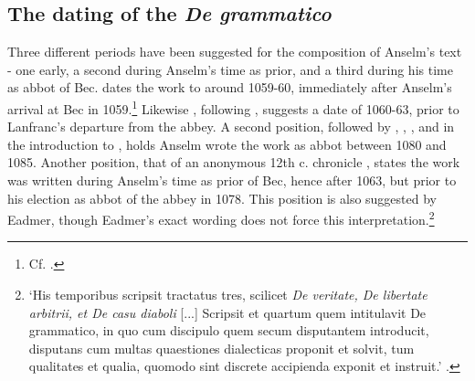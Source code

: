 \documentclass[]{article}
\begin{document}
\subsection{The dating of the \textit{De grammatico}}
Three different periods have been suggested for the composition of Anselm's text - one early, a second during Anselm's time as prior, and a third during his time as abbot of Bec. \cite[sec. 1]{Williams2015} dates the work to around 1059-60, immediately after Anselm's arrival at Bec in 1059.\footnote{Cf. \cite[p. 4]{Visser2009}.} Likewise \cite[p. 128]{Gasper2004}, following \cite[p. 65]{Southern1990}, suggests a date of 1060-63, prior to Lanfranc's departure from the abbey. A second position, followed by \cite{Schmidt1968}, \cite{Lewry1981}, \cite{Sharpe2009}, and in the introduction to \cite{Anselm1990}, holds Anselm wrote the work as abbot between 1080 and 1085. Another position, that of an anonymous 12th c. chronicle \cite[v. 158, 131-133]{PL}, states the work was written during Anselm's time as prior of Bec, hence after 1063, but prior to his election as abbot of the abbey in 1078. This position is also suggested by Eadmer, though Eadmer's exact wording does not force this interpretation.\footnote{`His temporibus scripsit tractatus tres, scilicet \textit{De veritate, De libertate arbitrii, et De casu diaboli} [...] Scripsit et quartum quem intitulavit De grammatico, in quo cum discipulo quem secum disputantem introducit, disputans cum multas quaestiones dialecticas proponit et solvit, tum qualitates et qualia, quomodo sint discrete accipienda exponit et instruit.' \cite[VA I, 25]{VA}.}
\end{document}

